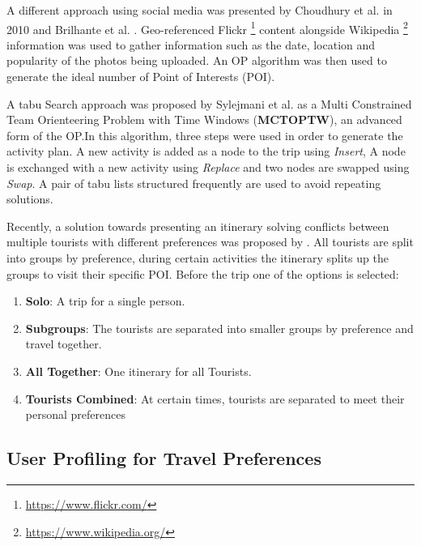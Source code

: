     A different approach using social media was presented by Choudhury
    et al. \cite{DeChoudhury2010} in 2010 and Brilhante et al.
    \cite{RamalhoBrilhante2014}. Geo-referenced Flickr
    \footnote{\url{https://www.flickr.com/}} content alongside
    Wikipedia \footnote{\url{https://www.wikipedia.org/}} information
    was used to gather information such as the date, location and
    popularity of the photos being uploaded. An OP algorithm was then
    used to generate the ideal number of Point of Interests (POI).

    A tabu Search approach was proposed by Sylejmani et al.
    \cite{Sylejmani2012} as a Multi Constrained Team Orienteering
    Problem with Time Windows (\textbf{MCTOPTW}), an advanced form of
    the OP.In this algorithm, three steps were used in order to
    generate the activity plan. A new activity is added as a node to
    the trip using \emph{Insert}, A node is exchanged with a new
    activity using \emph{Replace} and two nodes are swapped using
    \emph{Swap}. A pair of tabu lists structured frequently are used
    to avoid repeating solutions.


    Recently, a solution towards presenting an itinerary solving
    conflicts between multiple tourists with different preferences was
    proposed by  \cite{Sylejmani2017}. All tourists are split into
    groups by preference, during certain activities the itinerary
    splits up the groups to visit their specific POI. Before the trip
    one of the options is selected: 
    \begin{enumerate}
        \item \textbf{Solo}: A trip for a single person.
        \item \textbf{Subgroups}: The tourists are separated into
        smaller groups by preference and travel together.
        \item \textbf{All Together}: One itinerary for all Tourists.
        \item \textbf{Tourists Combined}: At certain times, tourists
    are separated to meet their personal preferences

    \end{enumerate}





\subsection{User Profiling for Travel Preferences}
 